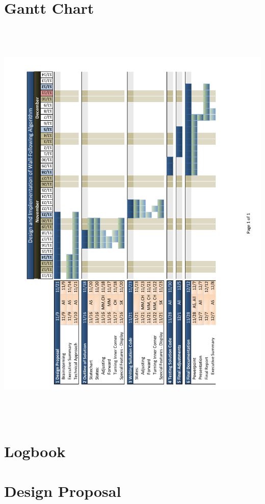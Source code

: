 \titleformat{\section}{\LARGE\bfseries}{\appendixname\:\thesection:}{1em}{}{}

\newpage
\begin{appendices}
\section{Gantt Chart} \label{appndx}
\begin{center}
\includegraphics[height = 8in]{graphics/gantt_chart}
\end{center}


\newpage
\thispagestyle{empty}
\section{Logbook}
\newpage
\thispagestyle{empty}
\section{Design Proposal}\label{proposal}
\end{appendices}